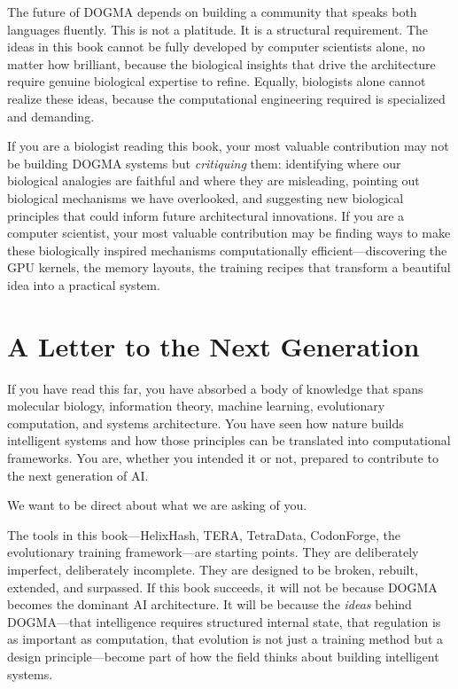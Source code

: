 The future of DOGMA depends on building a community that speaks both languages fluently. This is not a platitude. It is a structural requirement. The ideas in this book cannot be fully developed by computer scientists alone, no matter how brilliant, because the biological insights that drive the architecture require genuine biological expertise to refine. Equally, biologists alone cannot realize these ideas, because the computational engineering required is specialized and demanding.

\begin{implnote}
If you are a biologist reading this book, your most valuable contribution may not be building DOGMA systems but \emph{critiquing} them: identifying where our biological analogies are faithful and where they are misleading, pointing out biological mechanisms we have overlooked, and suggesting new biological principles that could inform future architectural innovations. If you are a computer scientist, your most valuable contribution may be finding ways to make these biologically inspired mechanisms computationally efficient---discovering the GPU kernels, the memory layouts, the training recipes that transform a beautiful idea into a practical system.
\end{implnote}

\section{A Letter to the Next Generation}
\label{sec:letter-to-reader}

\noindent
If you have read this far, you have absorbed a body of knowledge that spans molecular biology, information theory, machine learning, evolutionary computation, and systems architecture. You have seen how nature builds intelligent systems and how those principles can be translated into computational frameworks. You are, whether you intended it or not, prepared to contribute to the next generation of AI.

We want to be direct about what we are asking of you.

The tools in this book---HelixHash, TERA, TetraData, CodonForge, the evolutionary training framework---are starting points. They are deliberately imperfect, deliberately incomplete. They are designed to be broken, rebuilt, extended, and surpassed. If this book succeeds, it will not be because DOGMA becomes the dominant AI architecture. It will be because the \emph{ideas} behind DOGMA---that intelligence requires structured internal state, that regulation is as important as computation, that evolution is not just a training method but a design principle---become part of how the field thinks about building intelligent systems.

